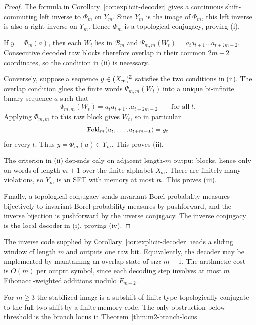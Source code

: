 \begin{proof}
The formula in Corollary~\ref{cor:explicit-decoder} gives a continuous
shift-commuting left inverse to $\Phi_m$ on $Y_m$.  Since $Y_m$ is the image of
$\Phi_m$, this left inverse is also a right inverse on $Y_m$.  Hence $\Phi_m$
is a topological conjugacy, proving (i).

If $y=\Phi_m(a)$, then each $W_t$ lies in $\mathcal B_m$ and
$\Psi_{m,m}(W_t)=a_ta_{t+1}\ldots a_{t+2m-2}$.  Consecutive decoded raw
blocks therefore overlap in their common $2m-2$ coordinates, so the condition
in (ii) is necessary.

Conversely, suppose a sequence $y\in(X_m)^{\mathbb{Z}}$ satisfies the two conditions
in (ii).  The overlap condition glues the finite words
$\Psi_{m,m}(W_t)$ into a unique bi-infinite binary sequence $a$ such that
\[
\Psi_{m,m}(W_t)=a_ta_{t+1}\ldots a_{t+2m-2}
\qquad\text{for all }t.
\]
Applying $\Phi_{m,m}$ to this raw block gives $W_t$, so in particular
\[
\mathrm{Fold}_m(a_t,\ldots,a_{t+m-1})=y_t
\]
for every $t$.  Thus $y=\Phi_m(a)\in Y_m$.  This proves (ii).

The criterion in (ii) depends only on adjacent length-$m$ output blocks, hence
only on words of length $m+1$ over the finite alphabet $X_m$.  There are
finitely many violations, so $Y_m$ is an SFT with memory at most $m$.  This
proves (iii).

Finally, a topological conjugacy sends invariant Borel probability measures
bijectively to invariant Borel probability measures by pushforward, and the
inverse bijection is pushforward by the inverse conjugacy.  The inverse
conjugacy is the local decoder in (i), proving (iv).
\end{proof}

\begin{remark}\label{rem:decoder-complexity}
The inverse code supplied by Corollary~\ref{cor:explicit-decoder} reads a
sliding window of length $m$ and outputs one raw bit. Equivalently, the decoder
may be implemented by maintaining an overlap state of size $m-1$. The
arithmetic cost is $O(m)$ per output symbol, since each decoding step involves
at most $m$ Fibonacci-weighted additions modulo $F_{m+2}$.
\end{remark}

\begin{remark}\label{rem:exact-recoding}
For $m\ge3$ the stabilized image is a subshift of finite type topologically
conjugate to the full two-shift by a finite-memory code. The only obstruction
below threshold is the branch locus in Theorem~\ref{thm:m2-branch-locus}.
\end{remark}


